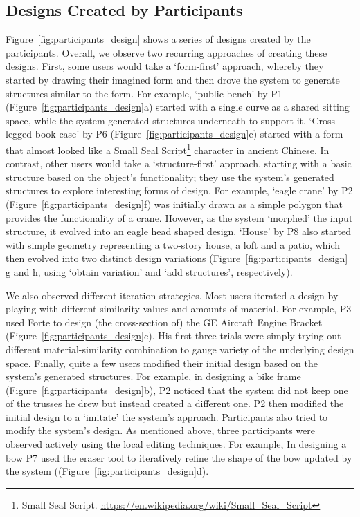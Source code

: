 \subsection{Designs Created by Participants}
Figure~\ref{fig:participants_design} shows a series of designs created by the participants. Overall, we observe two recurring approaches of creating these designs. First, some users would take a `form-first' approach, whereby they started by drawing their imagined form and then drove the system to generate structures similar to the form. For example, `public bench' by P1 (Figure~\ref{fig:participants_design}a) started with a single curve as a shared sitting space, while the system generated structures underneath to support it. `Cross-legged book case' by P6 (Figure~\ref{fig:participants_design}e) started with a form that almost looked like a Small Seal Script\footnote{Small Seal Script. \url{https://en.wikipedia.org/wiki/Small_Seal_Script}} character in ancient Chinese. In contrast, other users would take a `structure-first' approach, starting with a basic structure based on the object's functionality; they use the system's generated structures to explore interesting forms of design. For example, `eagle crane' by P2 (Figure~\ref{fig:participants_design}f) was initially drawn as a simple polygon that provides the functionality of a crane. However, as the system `morphed' the input structure, it evolved into an eagle head shaped design. `House' by P8 also started with simple geometry representing a two-story house, a loft and a patio, which then evolved into two distinct design variations (Figure~\ref{fig:participants_design} g and h, using `obtain variation' and `add structures', respectively).


We also observed different iteration strategies. Most users iterated a design by playing with different similarity values and amounts of material. For example, P3 used Forte to design (the cross-section of) the GE Aircraft Engine Bracket (Figure~\ref{fig:participants_design}c). His first three trials were simply trying out different material-similarity combination to gauge variety of the underlying design space. 
Finally, quite a few users modified their initial design based on the system's generated structures. For example, in designing a bike frame (Figure~\ref{fig:participants_design}b), P2 noticed that the system did not keep one of the trusses he drew but instead created a different one. P2 then modified the initial design to a `imitate' the system's approach. Participants also tried to modify the system's design. As mentioned above, three participants were observed actively using the local editing techniques. For example, In designing a bow P7 used the eraser tool to iteratively refine the shape of the bow updated by the system ((Figure~\ref{fig:participants_design}d).

